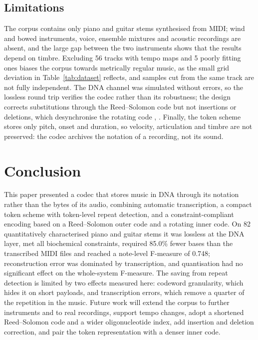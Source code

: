 \documentclass[conference]{IEEEtran}
\begin{document}
\subsection{Limitations}

The corpus contains only piano and guitar stems synthesised from MIDI; wind and bowed instruments, voice, ensemble mixtures and acoustic recordings are absent, and the large gap between the two instruments shows that the results depend on timbre. Excluding 56 tracks with tempo maps and 5 poorly fitting ones biases the corpus towards metrically regular music, as the small grid deviation in Table~\ref{tab:dataset} reflects, and samples cut from the same track are not fully independent. The DNA channel was simulated without errors, so the lossless round trip verifies the codec rather than its robustness; the design corrects substitutions through the Reed--Solomon code but not insertions or deletions, which desynchronise the rotating code \cite{press}, \cite{welzel}. Finally, the token scheme stores only pitch, onset and duration, so velocity, articulation and timbre are not preserved: the codec archives the notation of a recording, not its sound.

\section{Conclusion}

This paper presented a codec that stores music in DNA through its notation rather than the bytes of its audio, combining automatic transcription, a compact token scheme with token-level repeat detection, and a constraint-compliant encoding based on a Reed--Solomon outer code and a rotating inner code. On 82 quantitatively characterised piano and guitar stems it was lossless at the DNA layer, met all biochemical constraints, required 85.0\% fewer bases than the transcribed MIDI files and reached a note-level F-measure of 0.748; reconstruction error was dominated by transcription, and quantisation had no significant effect on the whole-system F-measure. The saving from repeat detection is limited by two effects measured here: codeword granularity, which hides it on short payloads, and transcription errors, which remove a quarter of the repetition in the music. Future work will extend the corpus to further instruments and to real recordings, support tempo changes, adopt a shortened Reed--Solomon code and a wider oligonucleotide index, add insertion and deletion correction, and pair the token representation with a denser inner code.
\end{document}
